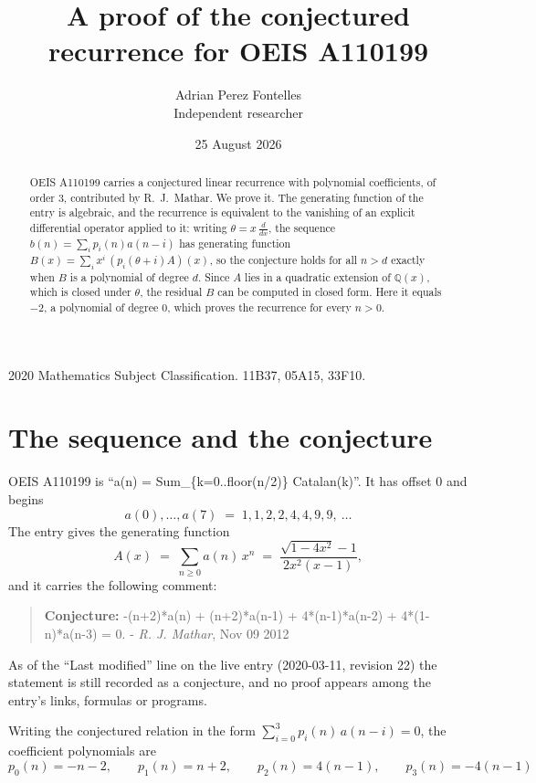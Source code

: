 \documentclass[11pt,a4paper]{article}
\title{A proof of the conjectured recurrence for OEIS A110199}
\author{Adrian Perez Fontelles\\ \small Independent researcher}
\date{25 August 2026}
\theoremstyle{plain}
\theoremstyle{definition}
\begin{document}
\maketitle

\begin{abstract}
OEIS A110199 carries a conjectured linear recurrence with polynomial coefficients, of
order 3, contributed by R.~J.~Mathar. We prove it. The generating function of the
entry is algebraic, and the recurrence is equivalent to the vanishing of an explicit
differential operator applied to it: writing $\theta=x\,\frac{d}{dx}$, the sequence
$b(n)=\sum_{i}p_{i}(n)a(n-i)$ has generating function
$B(x)=\sum_{i}x^{i}\,(p_{i}(\theta+i)A)(x)$, so the conjecture holds for all $n>d$ exactly
when $B$ is a polynomial of degree $d$. Since $A$ lies in a quadratic extension of
$\mathbb{Q}(x)$, which is closed under $\theta$, the residual $B$ can be computed in
closed form. Here it equals $-2$, a polynomial of degree $0$, which proves
the recurrence for every $n>0$.
\end{abstract}

\noindent\small 2020 Mathematics Subject Classification. 11B37, 05A15, 33F10.\normalsize

\section{The sequence and the conjecture}

OEIS A110199 is ``a(n) = Sum\_\{k=0..floor(n/2)\} Catalan(k)''. It has offset $0$ and begins
\[
a(0),\dots,a(7)\;=\;1, 1, 2, 2, 4, 4, 9, 9,\ \dots
\]
The entry gives the generating function
\begin{equation}\label{eq:gf}
A(x)\;=\;\sum_{n\ge 0} a(n)\,x^{n}\;=\;\frac{\sqrt{1 - 4 x^{2}} - 1}{2 x^{2} \left(x - 1\right)} ,
\end{equation}
and it carries the following comment:
\begin{quote}\small
\textbf{Conjecture:} -(n+2)*a(n) + (n+2)*a(n-1) + 4*(n-1)*a(n-2) + 4*(1-n)*a(n-3) = 0. - \emph{R. J. Mathar}, Nov 09 2012
\end{quote}
As of the ``Last modified'' line on the live entry (2020-03-11, revision 22) the
statement is still recorded as a conjecture, and no proof appears among the entry's links,
formulas or programs.

Writing the conjectured relation in the form $\sum_{i=0}^{3}p_{i}(n)\,a(n-i)=0$,
the coefficient polynomials are
\[
p_{0}(n)=- n - 2,\qquad p_{1}(n)=n + 2,\qquad p_{2}(n)=4 \left(n - 1\right),\qquad p_{3}(n)=- 4 \left(n - 1\right)
\]
\end{document}
